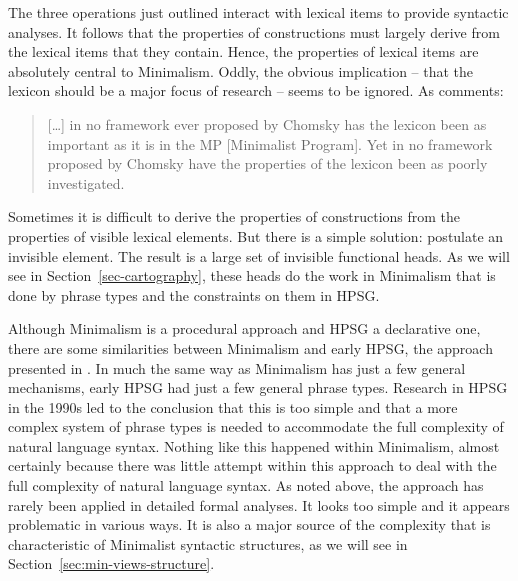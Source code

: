 \documentclass[output=paper
                ,modfonts
                ,nonflat
	        ,collection
	        ,collectionchapter
	        ,collectiontoclongg
 	        ,biblatex
                ,babelshorthands
                ,newtxmath
                ,draftmode
                ,colorlinks, citecolor=brown
]{./langsci/langscibook}
\begin{document}
The three operations just outlined interact with lexical items to provide syntactic analyses. It follows that the properties of constructions must largely derive from the lexical items that they contain. Hence, the properties of lexical items are absolutely central to Minimalism. Oddly, the obvious implication – that the lexicon should be a major focus of research – seems to be ignored. As \citet[95, fn.\,9]{Newmeyer2005a} comments:
\begin{quote}
[\ldots] in no framework ever proposed by Chomsky has the lexicon been as important as it is in the
MP [Minimalist Program]. Yet in no framework proposed by Chomsky have the properties of the lexicon
been as poorly investigated. \citep[95, fn.\,9]{Newmeyer2005a}
\end{quote}
Sometimes it is difficult to derive the properties of constructions from the properties of visible
lexical elements. But there is a simple solution: postulate an invisible element. The result is a
large set of invisible functional heads. As we will see in Section~\ref{sec-cartography}, these heads do the work in Minimalism that is done by phrase types and the constraints on them in HPSG.

Although Minimalism is a procedural approach and HPSG a declarative one, there are some
similarities between Minimalism and early HPSG, the approach presented in \citet{ps,ps2}. In much
the same way as Minimalism has just a few general mechanisms, early HPSG had just a few general
phrase types. Research in HPSG in the 1990s led to the conclusion that this is too simple and that a
more complex system of phrase types is needed to accommodate the full complexity of natural language
syntax. Nothing like this happened within Minimalism, almost certainly because there was little
attempt within this approach to deal with the full complexity of natural language syntax. As noted
above, the approach has rarely been applied in detailed formal analyses. It looks too simple and it
appears problematic in various ways. It is also a major source of the complexity that is
characteristic of Minimalist syntactic structures, as we will see in Section~\ref{sec:min-views-structure}. 

\end{document}
